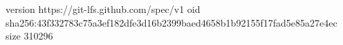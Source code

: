 version https://git-lfs.github.com/spec/v1
oid sha256:43f332783c75a3ef182dfe3d16b2399baed4658b1b92155f17fad5e85a27e4ec
size 310296

